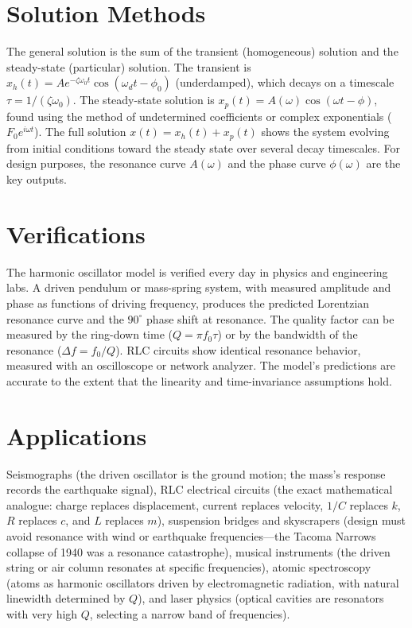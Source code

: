 \documentclass[11pt,openright]{book}
\begin{document}
\section*{Solution Methods}

The general solution is the sum of the transient (homogeneous) solution and the steady-state (particular) solution. The transient is $x_h(t) = Ae^{-\zeta\omega_0 t}\cos(\omega_d t - \phi_0)$ (underdamped), which decays on a timescale $\tau = 1/(\zeta\omega_0)$. The steady-state solution is $x_p(t) = A(\omega)\cos(\omega t - \phi)$, found using the method of undetermined coefficients or complex exponentials ($F_0 e^{i\omega t}$). The full solution $x(t) = x_h(t) + x_p(t)$ shows the system evolving from initial conditions toward the steady state over several decay timescales. For design purposes, the resonance curve $A(\omega)$ and the phase curve $\phi(\omega)$ are the key outputs.
\section*{Verifications}

The harmonic oscillator model is verified every day in physics and engineering labs. A driven pendulum or mass-spring system, with measured amplitude and phase as functions of driving frequency, produces the predicted Lorentzian resonance curve and the $90^\circ$ phase shift at resonance. The quality factor can be measured by the ring-down time ($Q = \pi f_0\tau$) or by the bandwidth of the resonance ($\Delta f = f_0/Q$). RLC circuits show identical resonance behavior, measured with an oscilloscope or network analyzer. The model's predictions are accurate to the extent that the linearity and time-invariance assumptions hold.
\section*{Applications}

Seismographs (the driven oscillator is the ground motion; the mass's response records the earthquake signal), RLC electrical circuits (the exact mathematical analogue: charge replaces displacement, current replaces velocity, $1/C$ replaces $k$, $R$ replaces $c$, and $L$ replaces $m$), suspension bridges and skyscrapers (design must avoid resonance with wind or earthquake frequencies---the Tacoma Narrows collapse of 1940 was a resonance catastrophe), musical instruments (the driven string or air column resonates at specific frequencies), atomic spectroscopy (atoms as harmonic oscillators driven by electromagnetic radiation, with natural linewidth determined by $Q$), and laser physics (optical cavities are resonators with very high $Q$, selecting a narrow band of frequencies).
\end{document}
